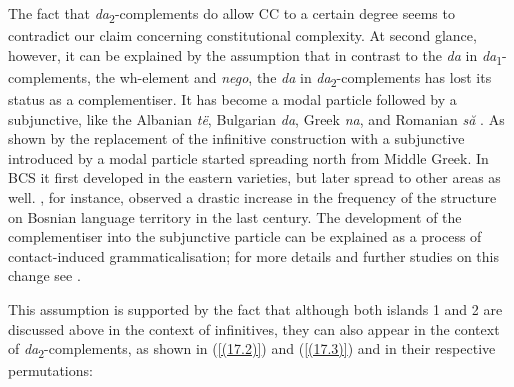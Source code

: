 The fact that \textit{da}\textsubscript{2}-complements do allow CC to a certain degree seems to contradict our claim concerning constitutional complexity. At second glance, however, it can be explained by the assumption that in contrast to the \textit{da} in \textit{da}\textsubscript{1}-complements, the wh-element and \textit{nego}, the \textit{da} in \textit{da}\textsubscript{2}-complements has lost its status as a complementiser. It has become a modal particle followed by a subjunctive, like the Albanian \textit{të}, Bulgarian \textit{da}, Greek \textit{na}, and Romanian \textit{să} \citep[see][]{Turano17}. As shown by \citet[][passim]{Joseph83} the replacement of the infinitive construction with a subjunctive introduced by a modal particle started spreading north from Middle Greek. In BCS it first developed in the eastern varieties, but later spread to other areas as well. \citet[][33f]{Markovic55}, for instance, observed a drastic increase in the frequency of the structure on Bosnian language territory in the last century. The development of the complementiser into the subjunctive particle can be explained as a process of contact-induced grammaticalisation; for more details and further studies on this change see \citet[][80--83]{WiemerHansen12}.

This assumption is supported by the fact that although both islands 1 and 2 are discussed above in the context of infinitives, they can also appear in the context of \textit{da}\textsubscript{2}-complements, as shown in (\ref{(17.2)}) and (\ref{(17.3)}) and in their respective permutations:

